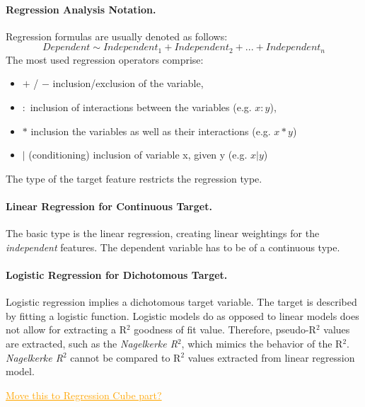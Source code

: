 \documentclass[journal]{style/vgtc} 			          %
\newcommand{\com}[1]{\textcolor{orange}{\uline{#1}}}
\begin{document}
\paragraph{Regression Analysis Notation.} Regression formulas are usually denoted as follows:
\begin{equation}
Dependent \sim Independent_1 + Independent_2 + ... + Independent_n
\label{eq:RegressionNotation}
\end{equation}
The most used regression operators comprise:
\begin{itemize}
	\item $+$ / $-$ inclusion/exclusion of the variable,
	\item $:$ inclusion of interactions between the variables (e.g. $x:y$),
	\item $*$ inclusion the variables as well as their interactions (e.g. $x*y$)
	\item $|$ (conditioning) inclusion of variable x, given y (e.g. $x|y$)
\end{itemize}
The type of the target feature restricts the regression type.

\paragraph{Linear Regression for Continuous Target.} The basic type is the linear regression, creating linear weightings for the \emph{independent} features.
The dependent variable has to be of a continuous type.

\paragraph{Logistic Regression for Dichotomous Target.} Logistic regression implies a dichotomous target variable.
The target is described by fitting a logistic function.
Logistic models do as opposed to linear models does not allow for extracting a R$^2$ goodness of fit value.
Therefore, pseudo-R$^2$ values are extracted, such as the \emph{Nagelkerke R$^2$}, which mimics the behavior of the R$^2$.
\emph{Nagelkerke R$^2$} cannot be compared to R$^2$ values extracted from linear regression model.

\com{Move this to Regression Cube part?}
\end{document}
